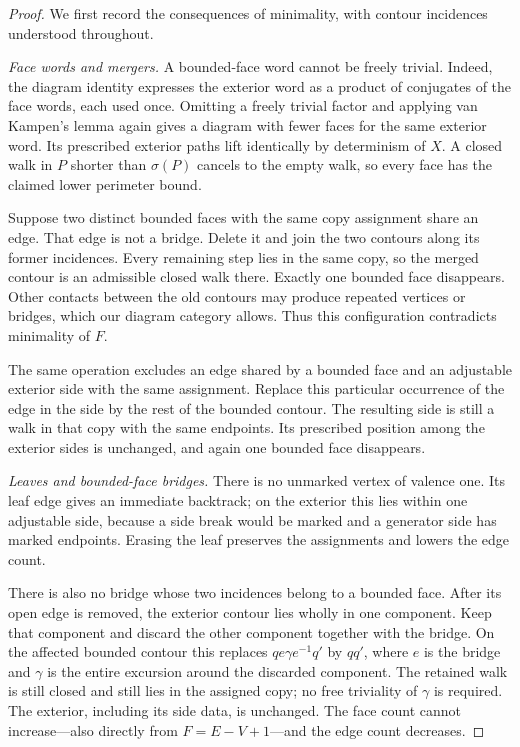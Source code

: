 \begin{proof}
We first record the consequences of minimality, with contour incidences
understood throughout.

\emph{Face words and mergers.}
A bounded-face word cannot be freely trivial. Indeed, the diagram
identity expresses the exterior word as a product of conjugates of the
face words, each used once. Omitting a freely trivial factor and applying
van Kampen's lemma again gives a diagram with fewer faces for the same
exterior word. Its prescribed exterior paths lift identically by
determinism of \(X\). A closed walk in \(P\) shorter than \(\sigma(P)\)
cancels to the empty walk, so every face has the claimed lower perimeter
bound.

Suppose two distinct bounded faces with the same copy assignment share
an edge. That edge is not a bridge. Delete it and join the two contours
along its former incidences. Every remaining step lies in the same copy,
so the merged contour is an admissible closed walk there. Exactly one
bounded face disappears. Other contacts between the old contours may
produce repeated vertices or bridges, which our diagram category allows.
Thus this configuration contradicts minimality of \(F\).

The same operation excludes an edge shared by a bounded face and an
adjustable exterior side with the same assignment. Replace this
particular occurrence of the edge in the side by the rest of the
bounded contour. The resulting side is still a walk in that copy with
the same endpoints. Its prescribed position among the exterior sides
is unchanged, and again one bounded face disappears.

\emph{Leaves and bounded-face bridges.}
There is no unmarked vertex of valence one. Its leaf edge gives an
immediate backtrack; on the exterior this lies within one adjustable side,
because a side break would be marked and a generator side has marked
endpoints. Erasing the leaf preserves the assignments and lowers the edge
count.

There is also no bridge whose two incidences belong to a bounded face.
After its open edge is removed, the exterior contour lies wholly in one
component. Keep that component and discard the other component together
with the bridge. On the affected bounded contour this replaces
\(q e\gamma e^{-1}q'\) by \(q q'\), where \(e\) is the bridge and
\(\gamma\) is the entire excursion around the discarded component.
The retained walk is still closed and still lies in the assigned copy;
no free triviality of \(\gamma\) is required. The exterior, including
its side data, is unchanged. The face count cannot increase---also
directly from \(F=E-V+1\)---and the edge count decreases.


\end{proof}
